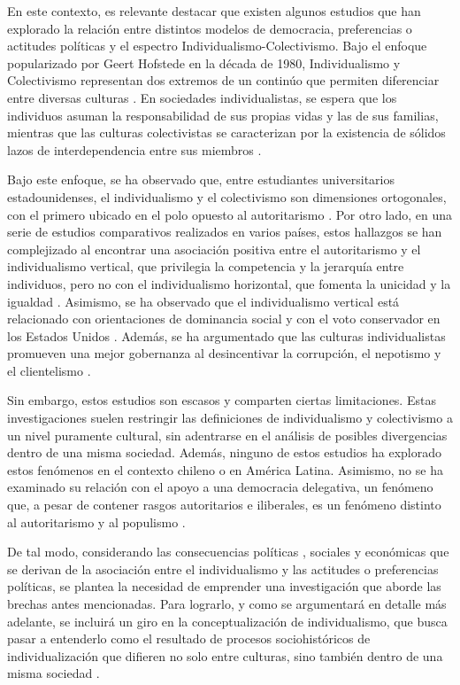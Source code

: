 \documentclass[12pt,twoside]{templates/facsothesis}
\begin{document}
En este contexto, es relevante destacar que existen algunos estudios que han explorado la relación entre distintos modelos de democracia, preferencias o actitudes políticas y el espectro Individualismo-Colectivismo. Bajo el enfoque popularizado por Geert Hofstede en la década de 1980, Individualismo y Colectivismo representan dos extremos de un continúo que permiten diferenciar entre diversas culturas \citep{oyserman2002}. En sociedades individualistas, se espera que los individuos asuman la responsabilidad de sus propias vidas y las de sus familias, mientras que las culturas colectivistas se caracterizan por la existencia de sólidos lazos de interdependencia entre sus miembros \citep{yoon2010}.

Bajo este enfoque, se ha observado que, entre estudiantes universitarios estadounidenses, el individualismo y el colectivismo son dimensiones ortogonales, con el primero ubicado en el polo opuesto al autoritarismo \citep{gelfand1996}. Por otro lado, en una serie de estudios comparativos realizados en varios países, estos hallazgos se han complejizado al encontrar una asociación positiva entre el autoritarismo y el individualismo vertical, que privilegia la competencia y la jerarquía entre individuos, pero no con el individualismo horizontal, que fomenta la unicidad y la igualdad \citep{kemmelmeier2003}. Asimismo, se ha observado que el individualismo vertical está relacionado con orientaciones de dominancia social \citep{strunk1999} y con el voto conservador en los Estados Unidos \citep{zhang2009}. Además, se ha argumentado que las culturas individualistas promueven una mejor gobernanza al desincentivar la corrupción, el nepotismo y el clientelismo \citep{kyriacou2016}.

Sin embargo, estos estudios son escasos y comparten ciertas limitaciones. Estas investigaciones suelen restringir las definiciones de individualismo y colectivismo a un nivel puramente cultural, sin adentrarse en el análisis de posibles divergencias dentro de una misma sociedad. Además, ninguno de estos estudios ha explorado estos fenómenos en el contexto chileno o en América Latina. Asimismo, no se ha examinado su relación con el apoyo a una democracia delegativa, un fenómeno que, a pesar de contener rasgos autoritarios e iliberales, es un fenómeno distinto al autoritarismo y al populismo \citep{carlin2011, carlin2018}.

De tal modo, considerando las consecuencias políticas \citep{zhang2009}, sociales \citep{strunk1999} y económicas \citep{kyriacou2016} que se derivan de la asociación entre el individualismo y las actitudes o preferencias políticas, se plantea la necesidad de emprender una investigación que aborde las brechas antes mencionadas. Para lograrlo, y como se argumentará en detalle más adelante, se incluirá un giro en la conceptualización de individualismo, que busca pasar a entenderlo como el resultado de procesos sociohistóricos de individualización que difieren no solo entre culturas, sino también dentro de una misma sociedad \citep{martuccelli2018}.
\end{document}
